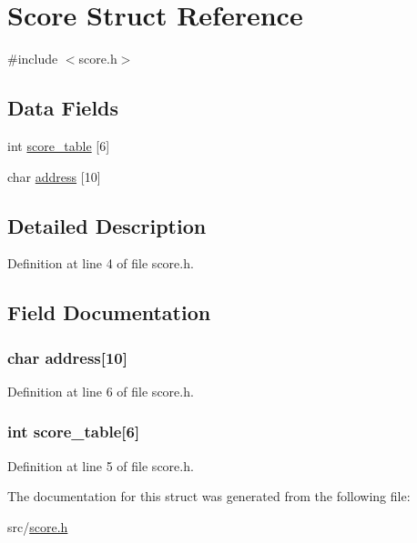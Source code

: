 \hypertarget{struct_score}{\section{Score Struct Reference}
\label{struct_score}
}


{\ttfamily \#include $<$score.\-h$>$}

\subsection*{Data Fields}
\begin{DoxyCompactItemize}
\item 
int \hyperlink{struct_score_aa5fb5a0021da3b9526e4ce8cc490815d}{score\-\_\-table} \mbox{[}6\mbox{]}
\item 
char \hyperlink{struct_score_abee56ac0c951e9dfdfa8ed977135faae}{address} \mbox{[}10\mbox{]}
\end{DoxyCompactItemize}


\subsection{Detailed Description}


Definition at line 4 of file score.\-h.



\subsection{Field Documentation}
\hypertarget{struct_score_abee56ac0c951e9dfdfa8ed977135faae}{
\subsubsection[{address}]{\setlength{\rightskip}{0pt plus 5cm}char address\mbox{[}10\mbox{]}}}\label{struct_score_abee56ac0c951e9dfdfa8ed977135faae}


Definition at line 6 of file score.\-h.

\hypertarget{struct_score_aa5fb5a0021da3b9526e4ce8cc490815d}{
\subsubsection[{score\-\_\-table}]{\setlength{\rightskip}{0pt plus 5cm}int score\-\_\-table\mbox{[}6\mbox{]}}}\label{struct_score_aa5fb5a0021da3b9526e4ce8cc490815d}


Definition at line 5 of file score.\-h.



The documentation for this struct was generated from the following file\-:\begin{DoxyCompactItemize}
\item 
src/\hyperlink{score_8h}{score.\-h}\end{DoxyCompactItemize}
